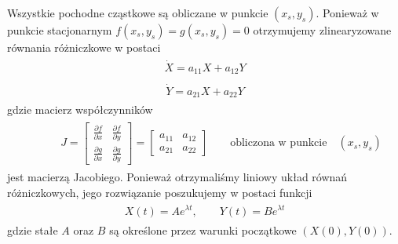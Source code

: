 \documentclass[a4paper,12pt,polish]{sphinxmanual}
\begin{document}
Wszystkie pochodne cząstkowe są obliczane w punkcie $(x_s, y_s)$. Ponieważ w punkcie stacjonarnym $f(x_s, y_s)=g(x_s, y_s)=0$ otrzymujemy zlinearyzowane równania różniczkowe w postaci
\label{ch1/chI023:equation-eqn31}\begin{gather}
\begin{split}\dot X =  a_{11} X +  a_{12} Y\end{split}\label{ch1/chI023-eqn31}
\end{gather}\label{ch1/chI023:equation-eqn32}\begin{gather}
\begin{split} \dot Y=  a_{21} X +  a_{22} Y\end{split}\label{ch1/chI023-eqn32}
\end{gather}
gdzie macierz współczynników
\label{ch1/chI023:equation-eqn33}\begin{gather}
\begin{split} \qquad \quad J = \begin{bmatrix}\frac{ \partial f}{\partial x}& \frac{\partial f}{\partial y}\\ \frac{\partial g}{\partial x}& \frac{\partial g}{\partial y}  \end{bmatrix}  =   \begin{bmatrix}a_{11} &  a_{12} \\ a_{21}& a_{22}  \end{bmatrix}   \quad \quad \mbox{obliczona w punkcie} \quad (x_s, y_s)\end{split}\label{ch1/chI023-eqn33}
\end{gather}
jest macierzą Jacobiego. Ponieważ otrzymaliśmy liniowy układ równań różniczkowych,  jego rozwiązanie poszukujemy w postaci funkcji
\label{ch1/chI023:equation-eqn34}\begin{gather}
\begin{split}X(t) = A e^{\lambda t}, \quad \quad  Y(t) = B e^{\lambda t}\end{split}\label{ch1/chI023-eqn34}
\end{gather}
gdzie stałe $A$ oraz $B$ są określone przez warunki początkowe $(X(0), Y(0))$.
\end{document}
